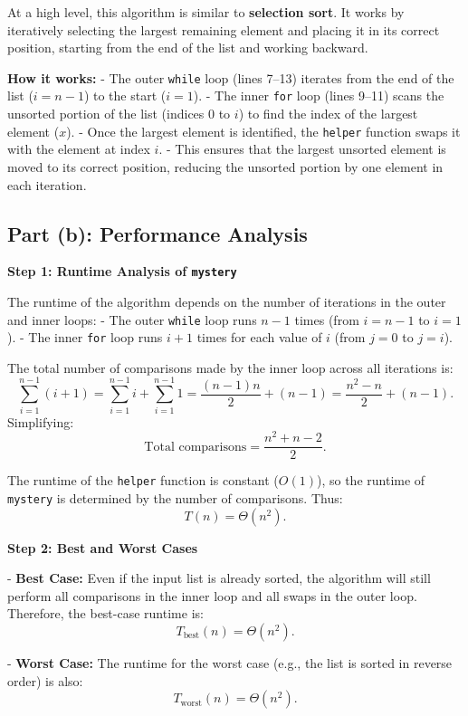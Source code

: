 \documentclass{article}
\begin{document}
At a high level, this algorithm is similar to \textbf{selection sort}. It works by iteratively selecting the largest remaining element and placing it in its correct position, starting from the end of the list and working backward.

\textbf{How it works:}
- The outer \texttt{while} loop (lines 7–13) iterates from the end of the list (\( i = n - 1 \)) to the start (\( i = 1 \)).
- The inner \texttt{for} loop (lines 9–11) scans the unsorted portion of the list (indices \( 0 \) to \( i \)) to find the index of the largest element (\( x \)).
- Once the largest element is identified, the \texttt{helper} function swaps it with the element at index \( i \).
- This ensures that the largest unsorted element is moved to its correct position, reducing the unsorted portion by one element in each iteration.

\subsection*{Part (b): Performance Analysis}

\textbf{Step 1: Runtime Analysis of \texttt{mystery}}

The runtime of the algorithm depends on the number of iterations in the outer and inner loops:
- The outer \texttt{while} loop runs \( n - 1 \) times (from \( i = n - 1 \) to \( i = 1 \)).
- The inner \texttt{for} loop runs \( i + 1 \) times for each value of \( i \) (from \( j = 0 \) to \( j = i \)).

The total number of comparisons made by the inner loop across all iterations is:
\[
\sum_{i=1}^{n-1} (i + 1) = \sum_{i=1}^{n-1} i + \sum_{i=1}^{n-1} 1 = \frac{(n-1)n}{2} + (n-1) = \frac{n^2 - n}{2} + (n-1).
\]
Simplifying:
\[
\text{Total comparisons} = \frac{n^2 + n - 2}{2}.
\]

The runtime of the \texttt{helper} function is constant (\( O(1) \)), so the runtime of \texttt{mystery} is determined by the number of comparisons. Thus:
\[
T(n) = \Theta(n^2).
\]

\textbf{Step 2: Best and Worst Cases}

- \textbf{Best Case:} Even if the input list is already sorted, the algorithm will still perform all comparisons in the inner loop and all swaps in the outer loop. Therefore, the best-case runtime is:
\[
T_{\text{best}}(n) = \Theta(n^2).
\]

- \textbf{Worst Case:} The runtime for the worst case (e.g., the list is sorted in reverse order) is also:
\[
T_{\text{worst}}(n) = \Theta(n^2).
\]
\end{document}
